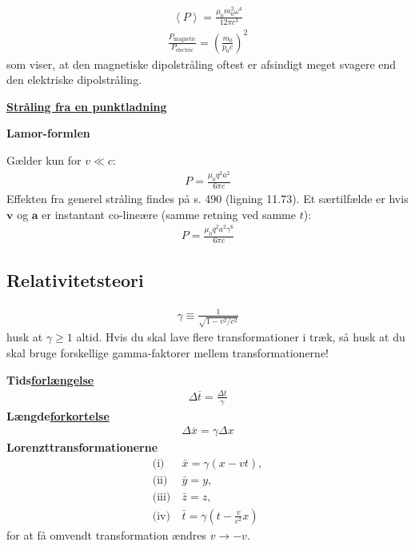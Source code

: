 \documentclass[a4paper]{article}
\begin{document}
    \begin{align*}
        \left\langle P \right\rangle = \frac{\mu _0 m_0 ^{2} \omega ^4}{12 \pi  c^3} \tag{11.40}
    \end{align*}
    \begin{align*}
        \frac{P_{\text{magnetic}}}{P_{\text{electric}}} = \left( \frac{m_0}{p_0 c} \right)^{2} \tag{11.41} 
    \end{align*}
    som viser, at den magnetiske dipolstråling oftest er afsindigt meget svagere end den elektriske dipolstråling.

    \underline{\textbf{Stråling fra en punktladning}}
    
    \textbf{Lamor-formlen}

    Gælder kun for \(v \ll c\):
    \begin{align*}
        \boxed{P = \frac{\mu _0 q^2 a^2}{6 \pi  c}} \tag{11.70}
    \end{align*} 
     Effekten fra generel stråling findes på s. 490 (ligning 11.73). Et særtilfælde er hvis \(\mathbf{v}\) og \(\mathbf{a}\) er instantant co-lineære (samme retning ved samme \(t\)): \begin{align*}
        P = \frac{\mu _0 q^{2} a^{2} \gamma ^6}{6 \pi c}
    \end{align*}  
    \subsection{Relativitetsteori}
    \begin{align*}
        \boxed{\gamma \equiv \frac{1}{\sqrt{1 - v^{2} /c^{2} } }} \tag{12.6}
    \end{align*}
    husk at \(\gamma \geq 1\) altid. Hvis du skal lave flere transformationer i træk, så husk at du skal bruge forskellige gamma-faktorer mellem transformationerne! 

    \textbf{} 
    
    \textbf{Tids\underline{forlængelse}} 
    \begin{align*}
        \Delta \overline{t} = \frac{\Delta t}{\gamma} \tag{12.5}
    \end{align*}
    \textbf{Længde\underline{forkortelse}}\begin{align*}
        \Delta \overline{x} = \gamma \Delta x \tag{12.9}
    \end{align*} 
    \textbf{Lorenzttransformationerne} 
    \begin{align*}
        \text{(i)} \ & \bar{x} = \gamma (x - vt), \tag{12.18}\\
        \text{(ii)} \ & \bar{y} = y, \\
        \text{(iii)} \ & \bar{z} = z, \\
        \text{(iv)} \ & \bar{t} = \gamma \left( t - \frac{v}{c^2} x \right)
    \end{align*}
    for at få omvendt transformation ændres \(v \to -v\).
\end{document}

